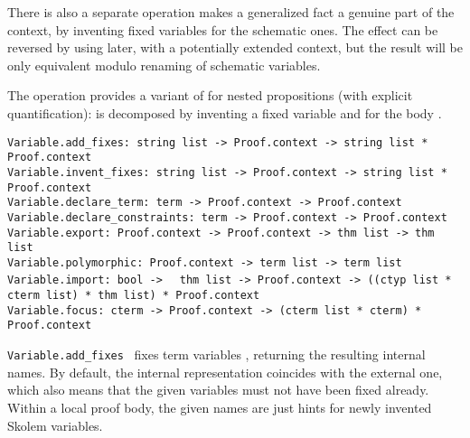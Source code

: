 \begin{isabellebody}
\begin{isamarkuptext}
  There is also a separate  operation makes a
  generalized fact a genuine part of the context, by inventing fixed
  variables for the schematic ones.  The effect can be reversed by
  using  later, with a potentially extended context,
  but the result will be only equivalent modulo renaming of schematic
  variables.

  The  operation provides a variant of 
  for nested propositions (with explicit quantification):  is decomposed by inventing a fixed variable 
  and for the body .%
\end{isamarkuptext}%
\isamarkuptrue%
%
\isadelimmlref
%
\endisadelimmlref
%
\isatagmlref
%
\begin{isamarkuptext}%
\begin{mldecls}
  \verb|Variable.add_fixes: string list -> Proof.context -> string list * Proof.context| \\
  \verb|Variable.invent_fixes: string list -> Proof.context -> string list * Proof.context| \\
  \verb|Variable.declare_term: term -> Proof.context -> Proof.context| \\
  \verb|Variable.declare_constraints: term -> Proof.context -> Proof.context| \\
  \verb|Variable.export: Proof.context -> Proof.context -> thm list -> thm list| \\
  \verb|Variable.polymorphic: Proof.context -> term list -> term list| \\
  \verb|Variable.import: bool ->|\isasep\isanewline%
\verb|  thm list -> Proof.context -> ((ctyp list * cterm list) * thm list) * Proof.context| \\
  \verb|Variable.focus: cterm -> Proof.context -> (cterm list * cterm) * Proof.context| \\
  \end{mldecls}

  \begin{description}

  \item \verb|Variable.add_fixes|~ fixes term
  variables , returning the resulting internal names.  By
  default, the internal representation coincides with the external
  one, which also means that the given variables must not have been
  fixed already.  Within a local proof body, the given names are just
  hints for newly invented Skolem variables.


\end{description}
\end{isamarkuptext}
\end{isabellebody}

